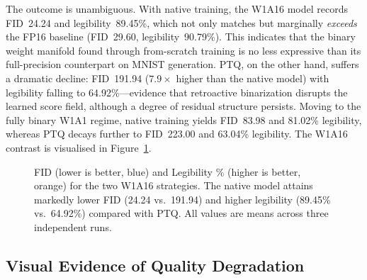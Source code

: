 \documentclass[twocolumn, journal]{IEEEtran}
\begin{document}
The outcome is unambiguous. With native training, the W1A16 model records FID~24.24 and
legibility~89.45\%, which not only matches but marginally \emph{exceeds} the FP16
baseline (FID~29.60, legibility~90.79\%). This indicates that the binary weight manifold
found through from-scratch training is no less expressive than its full-precision
counterpart on MNIST generation. PTQ, on the other hand, suffers a dramatic decline:
FID~191.94 ($7.9\times$ higher than the native model) with legibility falling to
64.92\%---evidence that retroactive binarization disrupts the learned score field,
although a degree of residual structure persists. Moving to the fully binary W1A1
regime, native training yields FID~83.98 and 81.02\% legibility, whereas PTQ decays
further to FID~223.00 and 63.04\% legibility. The W1A16 contrast is visualised in
Figure~\ref{fig:chart}.

\begin{figure}[h]
\centering
{}
\caption{FID (lower is better, blue) and Legibility \% (higher is better, orange) for
the two W1A16 strategies. The native model attains markedly lower FID (24.24 vs.\
191.94) and higher legibility (89.45\% vs.\ 64.92\%) compared with PTQ. All values are
means across three independent runs.}
\label{fig:chart}
\end{figure}

\subsection{Visual Evidence of Quality Degradation}
\end{document}
